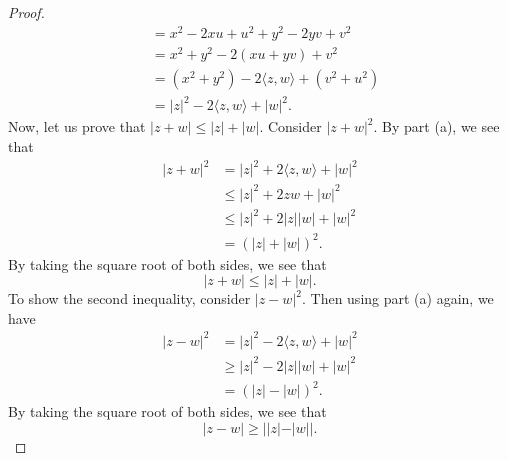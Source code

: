 \documentclass[a4paper]{article}
\begin{document}
\begin{enumerate}
\begin{proof}
\begin{align*}
                                                           &=  x^{2} -2xu + u^{2} + y^{2} -2yv + v^{2} \\
                                                           &= x^{2} + y^{2} -2(xu + yv) + v^{2} \\
                                                           &= (x^{2}  + y^{2}) -2 \langle z , w \rangle + (v^{2} + u^{2}) \\ 
                                                           &= | z |^{2} - 2 \langle z , w \rangle + | w |^{2}.
\end{align*}
Now, let us prove that \( | z + w  | \leq | z  |  + | w |  \). Consider \( | z + w  |^{2} \). By part (a), we see that
\begin{align*}
    | z + w  |^{2} &= | z  |^{2} + 2 \langle z , w \rangle + | w |^{2} \\
                   &\leq | z |^{2} + 2 z  w + | w |^{2} \\ 
                   &\leq | z |^{2} + 2 | z | | w |  + | w |^{2} \\
                   &= (| z |  + | w | )^{2}.
\end{align*}
By taking the square root of both sides, we see that
\[  | z + w  | \leq | z  |  + | w |. \]
To show the second inequality, consider \( | z - w  |^{2} \). Then using part (a) again, we have
\begin{align*}
    | z - w  |^{2} &= | z |^{2} - 2 \langle z , w \rangle + | w  |^{2} \\
                   & \geq | z |^{2} - 2 | z | | w |  + | w |^{2} \\ 
                   &= (| z |  - | w |)^{2}. 
\end{align*}
By taking the square root of both sides, we see that 
\[  | z - w  | \geq |  | z  |  - | w |  |.  \]



                \end{proof}
        \end{enumerate}
\end{document}

